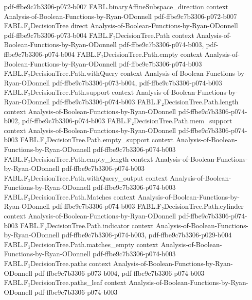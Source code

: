 \begin{theorem}
  {pdf-ffbe9c7b3306-p072-b007}
\proofstep
  {FABL.binaryAffineSubspace_direction}
  {context}
  {Analysis-of-Boolean-Functions-by-Ryan-ODonnell}
  {pdf-ffbe9c7b3306-p072-b007}
\proofstep
  {FABL.F₂DecisionTree}
  {direct}
  {Analysis-of-Boolean-Functions-by-Ryan-ODonnell}
  {pdf-ffbe9c7b3306-p073-b004}
\proofstep
  {FABL.F₂DecisionTree.Path}
  {context}
  {Analysis-of-Boolean-Functions-by-Ryan-ODonnell}
  {pdf-ffbe9c7b3306-p074-b003,
    pdf-ffbe9c7b3306-p074-b004}
\proofstep
  {FABL.F₂DecisionTree.Path.empty}
  {context}
  {Analysis-of-Boolean-Functions-by-Ryan-ODonnell}
  {pdf-ffbe9c7b3306-p074-b003}
\proofstep
  {FABL.F₂DecisionTree.Path.withQuery}
  {context}
  {Analysis-of-Boolean-Functions-by-Ryan-ODonnell}
  {pdf-ffbe9c7b3306-p073-b004,
    pdf-ffbe9c7b3306-p074-b003}
\proofstep
  {FABL.F₂DecisionTree.Path.support}
  {context}
  {Analysis-of-Boolean-Functions-by-Ryan-ODonnell}
  {pdf-ffbe9c7b3306-p074-b003}
\proofstep
  {FABL.F₂DecisionTree.Path.length}
  {context}
  {Analysis-of-Boolean-Functions-by-Ryan-ODonnell}
  {pdf-ffbe9c7b3306-p074-b002,
    pdf-ffbe9c7b3306-p074-b003}
\proofstep
  {FABL.F₂DecisionTree.Path.mem_support}
  {context}
  {Analysis-of-Boolean-Functions-by-Ryan-ODonnell}
  {pdf-ffbe9c7b3306-p074-b003}
\proofstep
  {FABL.F₂DecisionTree.Path.empty_support}
  {context}
  {Analysis-of-Boolean-Functions-by-Ryan-ODonnell}
  {pdf-ffbe9c7b3306-p074-b003}
\proofstep
  {FABL.F₂DecisionTree.Path.empty_length}
  {context}
  {Analysis-of-Boolean-Functions-by-Ryan-ODonnell}
  {pdf-ffbe9c7b3306-p074-b003}
\proofstep
  {FABL.F₂DecisionTree.Path.withQuery_output}
  {context}
  {Analysis-of-Boolean-Functions-by-Ryan-ODonnell}
  {pdf-ffbe9c7b3306-p074-b003}
\proofstep
  {FABL.F₂DecisionTree.Path.Matches}
  {context}
  {Analysis-of-Boolean-Functions-by-Ryan-ODonnell}
  {pdf-ffbe9c7b3306-p074-b003}
\proofstep
  {FABL.F₂DecisionTree.Path.cylinder}
  {context}
  {Analysis-of-Boolean-Functions-by-Ryan-ODonnell}
  {pdf-ffbe9c7b3306-p074-b003}
\proofstep
  {FABL.F₂DecisionTree.Path.indicator}
  {context}
  {Analysis-of-Boolean-Functions-by-Ryan-ODonnell}
  {pdf-ffbe9c7b3306-p074-b003,
    pdf-ffbe9c7b3306-p029-b004}
\proofstep
  {FABL.F₂DecisionTree.Path.matches_empty}
  {context}
  {Analysis-of-Boolean-Functions-by-Ryan-ODonnell}
  {pdf-ffbe9c7b3306-p074-b003}
\proofstep
  {FABL.F₂DecisionTree.paths}
  {context}
  {Analysis-of-Boolean-Functions-by-Ryan-ODonnell}
  {pdf-ffbe9c7b3306-p073-b004,
    pdf-ffbe9c7b3306-p074-b003}
\proofstep
  {FABL.F₂DecisionTree.paths_leaf}
  {context}
  {Analysis-of-Boolean-Functions-by-Ryan-ODonnell}
  {pdf-ffbe9c7b3306-p074-b003}

\end{theorem}
